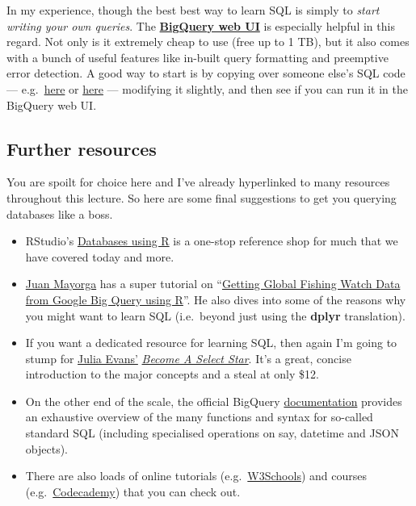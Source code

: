 \documentclass[
]{article}
\providecommand{\tightlist}{%
  \setlength{\itemsep}{0pt}\setlength{\parskip}{0pt}}
\begin{document}
In my experience, though the best best way to learn SQL is simply to
\emph{start writing your own queries}. The
\href{https://console.cloud.google.com/bigquery}{\textbf{BigQuery web
UI}} is especially helpful in this regard. Not only is it extremely
cheap to use (free up to 1 TB), but it also comes with a bunch of useful
features like in-built query formatting and preemptive error detection.
A good way to start is by copying over someone else's SQL code ---
e.g.~\href{https://towardsdatascience.com/bigquery-without-a-credit-card-discover-learn-and-share-199e08d4a064}{here}
or
\href{https://globalfishingwatch.org/data-blog/our-data-in-bigquery/}{here}
--- modifying it slightly, and then see if you can run it in the
BigQuery web UI.

\hypertarget{further-resources}{%
\subsection{Further resources}\label{further-resources}}

You are spoilt for choice here and I've already hyperlinked to many
resources throughout this lecture. So here are some final suggestions to
get you querying databases like a boss.

\begin{itemize}
\tightlist
\item
  RStudio's \href{https://db.rstudio.com}{Databases using R} is a
  one-stop reference shop for much that we have covered today and more.
\item
  \href{https://twitter.com/juansmayorga}{Juan Mayorga} has a super
  tutorial on
  ``\href{http://jsmayorga.com/post/getting-global-fishing-watch-from-google-bigquery-using-r}{Getting
  Global Fishing Watch Data from Google Big Query using R}''. He also
  dives into some of the reasons why you might want to learn SQL
  (i.e.~beyond just using the \textbf{dplyr} translation).
\item
  If you want a dedicated resource for learning SQL, then again I'm
  going to stump for \href{https://twitter.com/b0rk}{Julia Evans'}
  \href{https://wizardzines.com/zines/sql/}{\emph{Become A Select
  Star}}. It's a great, concise introduction to the major concepts and a
  steal at only \$12.
\item
  On the other end of the scale, the official BigQuery
  \href{https://cloud.google.com/bigquery/docs/}{documentation} provides
  an exhaustive overview of the many functions and syntax for so-called
  standard SQL (including specialised operations on say, datetime and
  JSON objects).
\item
  There are also loads of online tutorials
  (e.g.~\href{https://www.w3schools.com/sql/default.asp}{W3Schools}) and
  courses
  (e.g.~\href{https://www.codecademy.com/learn/learn-sql}{Codecademy})
  that you can check out.
\end{itemize}
\end{document}
